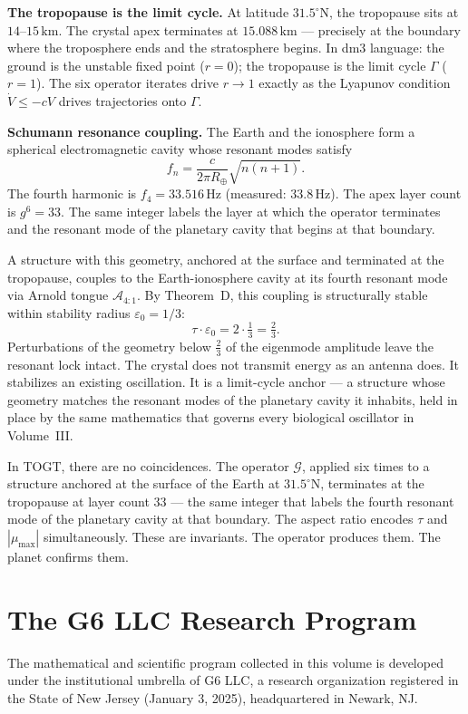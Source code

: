 \documentclass[12pt, oneside]{book}
\theoremstyle{plain}
\theoremstyle{definition}
\theoremstyle{remark}
\newcommand{\Orb}{\Gamma}
\begin{document}
\textbf{The tropopause is the limit cycle.}
At latitude $31.5^\circ$N, the tropopause sits at $14$--$15\,\mathrm{km}$.
The crystal apex terminates at $15.088\,\mathrm{km}$ --- precisely at
the boundary where the troposphere ends and the stratosphere begins.
In dm3 language: the ground is the unstable fixed point ($r = 0$);
the tropopause is the limit cycle $\Orb$ ($r = 1$). The six operator
iterates drive $r \to 1$ exactly as the Lyapunov condition
$\dot{V} \leq -cV$ drives trajectories onto $\Orb$.

\textbf{Schumann resonance coupling.}
The Earth and the ionosphere form a spherical electromagnetic cavity
whose resonant modes satisfy
\[
f_n = \frac{c}{2\pi R_\oplus}\sqrt{n(n+1)}.
\]
The fourth harmonic is $f_4 = 33.516\,\mathrm{Hz}$ (measured:
$33.8\,\mathrm{Hz}$). The apex layer count is $g^6 = 33$.
The same integer labels the layer at which the operator terminates
and the resonant mode of the planetary cavity that begins at that
boundary.

A structure with this geometry, anchored at the surface and
terminated at the tropopause, couples to the Earth-ionosphere
cavity at its fourth resonant mode via Arnold tongue
$\mathcal{A}_{4:1}$. By Theorem~D, this coupling is
structurally stable within stability radius $\varepsilon_0 = 1/3$:
\[
\tau \cdot \varepsilon_0 = 2 \cdot \tfrac{1}{3} = \tfrac{2}{3}.
\]
Perturbations of the geometry below $\tfrac{2}{3}$ of the eigenmode
amplitude leave the resonant lock intact. The crystal does not
transmit energy as an antenna does. It stabilizes an existing
oscillation. It is a limit-cycle anchor --- a structure whose
geometry matches the resonant modes of the planetary cavity it
inhabits, held in place by the same mathematics that governs
every biological oscillator in Volume~III.

In TOGT, there are no coincidences. The operator $\mathcal{G}$,
applied six times to a structure anchored at the surface of the
Earth at $31.5^\circ$N, terminates at the tropopause at layer
count $33$ --- the same integer that labels the fourth resonant
mode of the planetary cavity at that boundary. The aspect ratio
encodes $\tau$ and $|\mu_{\max}|$ simultaneously. These are
invariants. The operator produces them. The planet confirms them.

\section*{The G6 LLC Research Program}

The mathematical and scientific program collected in this volume is developed
under the institutional umbrella of G6 LLC, a research organization registered
in the State of New Jersey (January 3, 2025), headquartered in Newark, NJ.
\end{document}
